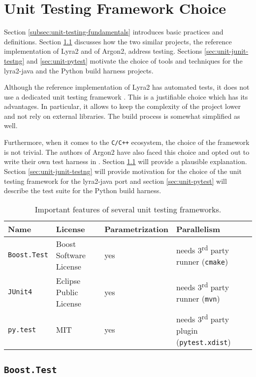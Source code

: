 \chapter{Unit Testing Framework Choice}
\label{sec:unit-testing-framework-choice}

Section \ref{subsec:unit-testing-fundamentals} introduces basic practices and definitions. Section \ref{sec:unit-boost-google} discusses how the two similar projects, the reference implementation of Lyra2 and of Argon2, address testing. Sections \ref{sec:unit-junit-testng} and \ref{sec:unit-pytest} motivate the choice of tools and techniques for the lyra2-java and the Python build harness projects.

Although the reference implementation of Lyra2 has automated tests, it does not use a dedicated unit testing framework \cite{github:2017:lyra}. This is a justifiable choice which has its advantages. In particular, it allows to keep the complexity of the project lower and not rely on external libraries. The build process is somewhat simplified as well.

Furthermore, when it comes to the \texttt{C/C++} ecosystem, the choice of the framework is not trivial. The authors of Argon2 have also faced this choice and opted out to write their own test harness in \cite{github:2017:argon2-test.c}. Section \ref{sec:unit-boost-google} will provide a plausible explanation. Section \ref{sec:unit-junit-testng} will provide motivation for the choice of the unit testing framework for the lyra2-java port and section \ref{sec:unit-pytest} will describe the test suite for the Python build harness.

\begin{table}
\begin{tabular}{llll}
    Name & License & Parametrization & Parallelism \\ \hline
\texttt{Boost.Test} & Boost Software License & yes & needs 3\textsuperscript{rd} party runner (\texttt{cmake}) \\
\texttt{JUnit4} & Eclipse Public License & yes & needs 3\textsuperscript{rd} party runner (\texttt{mvn}) \\
\texttt{py.test} & MIT & yes & needs 3\textsuperscript{rd} party plugin (\texttt{pytest.xdist})
\end{tabular}
\caption{Important features of several unit testing frameworks.}
\label{table:framework-features-cpp}
\end{table}

\section{\texttt{Boost.Test}}
\label{sec:unit-boost-google}

